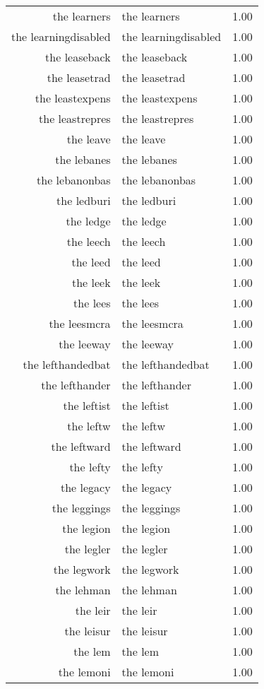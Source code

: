 \begin{table}[ht]
\begin{tabular}{rlr}
  the learners & the learners & 1.00 \\ 
  the learningdisabled & the learningdisabled & 1.00 \\ 
  the leaseback & the leaseback & 1.00 \\ 
  the leasetrad & the leasetrad & 1.00 \\ 
  the leastexpens & the leastexpens & 1.00 \\ 
  the leastrepres & the leastrepres & 1.00 \\ 
  the leave & the leave & 1.00 \\ 
  the lebanes & the lebanes & 1.00 \\ 
  the lebanonbas & the lebanonbas & 1.00 \\ 
  the ledburi & the ledburi & 1.00 \\ 
  the ledge & the ledge & 1.00 \\ 
  the leech & the leech & 1.00 \\ 
  the leed & the leed & 1.00 \\ 
  the leek & the leek & 1.00 \\ 
  the lees & the lees & 1.00 \\ 
  the leesmcra & the leesmcra & 1.00 \\ 
  the leeway & the leeway & 1.00 \\ 
  the lefthandedbat & the lefthandedbat & 1.00 \\ 
  the lefthander & the lefthander & 1.00 \\ 
  the leftist & the leftist & 1.00 \\ 
  the leftw & the leftw & 1.00 \\ 
  the leftward & the leftward & 1.00 \\ 
  the lefty & the lefty & 1.00 \\ 
  the legacy & the legacy & 1.00 \\ 
  the leggings & the leggings & 1.00 \\ 
  the legion & the legion & 1.00 \\ 
  the legler & the legler & 1.00 \\ 
  the legwork & the legwork & 1.00 \\ 
  the lehman & the lehman & 1.00 \\ 
  the leir & the leir & 1.00 \\ 
  the leisur & the leisur & 1.00 \\ 
  the lem & the lem & 1.00 \\ 
  the lemoni & the lemoni & 1.00 \\ 

\end{tabular}
\end{table}
